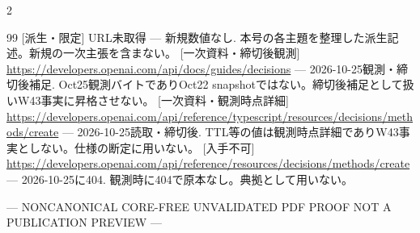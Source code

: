 \documentclass[lualatex,a4paper,10pt]{jlreq}
\begin{document}
\begin{multicols}{2}
{\begin{thebibliography}{99}
 [派生・限定] URL未取得 --- 新規数値なし. 本号の各主題を整理した派生記述。新規の一次主張を含まない。
 [一次資料・締切後観測] \url{https://developers.openai.com/api/docs/guides/decisions} --- 2026-10-25観測・締切後補足. Oct25観測バイトでありOct22 snapshotではない。締切後補足として扱いW43事実に昇格させない。
 [一次資料・観測時点詳細] \url{https://developers.openai.com/api/reference/typescript/resources/decisions/methods/create} --- 2026-10-25読取・締切後. TTL等の値は観測時点詳細でありW43事実としない。仕様の断定に用いない。
 [入手不可] \url{https://developers.openai.com/api/reference/resources/decisions/methods/create} --- 2026-10-25に404. 観測時に404で原本なし。典拠として用いない。
\end{thebibliography}}

\end{multicols} %
\begin{center}\color{SurveyMuted}--- NONCANONICAL CORE-FREE UNVALIDATED PDF PROOF \quad NOT A PUBLICATION PREVIEW ---\end{center}
\end{document}
